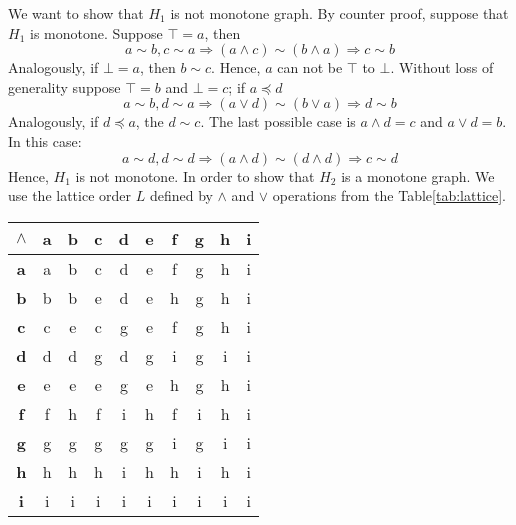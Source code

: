 \begin{example}
We want to show that \(H_1\) is not monotone graph. By counter proof, suppose that
\(H_1\) is monotone. Suppose \(\top = a\), then
\[a \sim b, c \sim a \Rightarrow (a \wedge c) \sim (b \wedge a) \Rightarrow c \sim b\]
Analogously, if \(\bot = a\), then \(b \sim c\)\@. Hence, \(a\) can not be \(\top\) to \(\bot\)\@.
Without loss of generality suppose \(\top = b\) and \(\bot = c\); if \(a \preceq d\)
\[a \sim b, d \sim a \Rightarrow (a \vee d) \sim (b \vee a) \Rightarrow d \sim b\]
Analogously, if \(d \preceq a\), the \(d \sim c\)\@. The last possible case is 
\(a \wedge d = c\) and \(a \vee d = b\). In this case:
\[a \sim d, d \sim d \Rightarrow (a \wedge d) \sim (d \wedge d) \Rightarrow c \sim d\]
Hence, \(H_1\) is not monotone. In order to show that \(H_2\) is a monotone graph. We use the lattice order
\(L\) defined by \(\wedge\) and \(\vee\) operations from the Table\ref{tab:lattice}\@.
\begin{table}
\begin{minipage}{.45\linewidth}
\begin{tabular}{c|c c c c c c c c c}
\(\wedge\) & \textbf{a} & \textbf{b} & \textbf{c} & \textbf{d} & \textbf{e} & \textbf{f} & \textbf{g} & \textbf{h} & \textbf{i} \\
\hline
\textbf{a} & a          & b          & c          & d          & e          & f          & g          & h          & i \\
\textbf{b} & b          & b          & e          & d          & e          & h          & g          & h          & i \\
\textbf{c} & c          & e          & c          & g          & e          & f          & g          & h          & i \\
\textbf{d} & d          & d          & g          & d          & g          & i          & g          & i          & i \\
\textbf{e} & e          & e          & e          & g          & e          & h          & g          & h          & i \\
\textbf{f} & f          & h          & f          & i          & h          & f          & i          & h          & i \\
\textbf{g} & g          & g          & g          & g          & g          & i          & g          & i          & i \\
\textbf{h} & h          & h          & h          & i          & h          & h          & i          & h          & i \\
\textbf{i} & i          & i          & i          & i          & i          & i          & i          & i          & i \\

\end{tabular}
\end{minipage}
\end{table}
\end{example}
